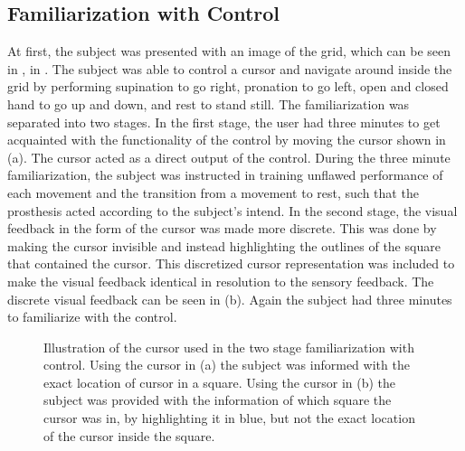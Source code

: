 \subsection{Familiarization with Control} \label{sec:meth:contrain}

At first, the subject was presented with an image of the grid, which can be seen in , in . The subject was able to control a cursor and navigate around inside the grid by performing supination to go right, pronation to go left, open and closed hand to go up and down, and rest to stand still. The familiarization was separated into two stages. In the first stage, the user had three minutes to get acquainted with the functionality of the control by moving the cursor shown in  (a). The cursor acted as a direct output of the control. During the three minute familiarization, the subject was instructed in training unflawed performance of each movement and the transition from a movement to rest, such that the prosthesis acted according to the subject's intend. In the second stage, the visual feedback in the form of the cursor was made more discrete. This was done by making the cursor invisible and instead highlighting the outlines of the square that contained the cursor. This discretized cursor representation was included to make the visual feedback identical in resolution to the sensory feedback. The discrete visual feedback can be seen in  (b). Again the subject had three minutes to familiarize with the control. 

\begin{figure}[H]
	\hspace{0.9cm}
	\caption{Illustration of the cursor used in the two stage familiarization with control.  Using the cursor in (a) the subject was informed with the exact location of cursor in a square. Using the cursor in (b) the subject was provided with the information of which square the cursor was in, by highlighting it in blue, but not the exact location of the cursor inside the square. }
	\label{fig:C1}
\end{figure}

